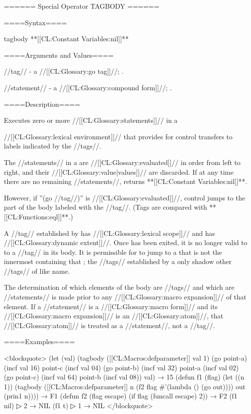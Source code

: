 ====== Special Operator TAGBODY ======

====Syntax====

\DefspecWithValues tagbody {} {**[[CL:Constant Variables:nil]]**}

====Arguments and Values====

//tag// - a //[[CL:Glossary:go tag]]//; \noeval.

//statement// - a //[[CL:Glossary:compound form]]//; \evalspecial.

====Description====

Executes zero or more //[[CL:Glossary:statements]]// in a

//[[CL:Glossary:lexical environment]]// that provides for control transfers to labels indicated by the //tags//.

The //statements// in a  are //[[CL:Glossary:evaluated]]// in order from left to right, and their //[[CL:Glossary:value|values]]// are discarded. If at any time there are no remaining //statements//,  returns **[[CL:Constant Variables:nil]]**.

However, if ''(go //tag//)'' is //[[CL:Glossary:evaluated]]//, control jumps to the part of the body labeled with the //tag//. (Tags are compared with **[[CL:Functions:eql]]**.)

A //tag// established by  has //[[CL:Glossary:lexical scope]]// and has //[[CL:Glossary:dynamic extent]]//. Once  has been exited, it is no longer valid to  to a //tag// in its body. It is permissible for  to jump to a  that is not the innermost  containing that ; the //tags// established by a  only shadow other //tags// of like name.

The determination of which elements of the body are //tags// and which are //statements// is made prior to any //[[CL:Glossary:macro expansion]]// of that element. If a //statement// is a //[[CL:Glossary:macro form]]// and its //[[CL:Glossary:macro expansion]]// is an //[[CL:Glossary:atom]]//, that //[[CL:Glossary:atom]]// is treated as a //statement//, not a //tag//.

====Examples====

<blockquote> (let (val) (tagbody ([[CL:Macros:defparameter]] val 1) (go point-a) (incf val 16) point-c (incf val 04) (go point-b) (incf val 32) point-a (incf val 02) (go point-c) (incf val 64) point-b (incf val 08)) val) → 15 (defun f1 (flag) (let ((n 1)) (tagbody ([[CL:Macros:defparameter]] n (f2 flag #'(lambda () (go out)))) out (prin1 n)))) → F1 (defun f2 (flag escape) (if flag (funcall escape) 2)) → F2 (f1 nil)
▷ 2 → NIL (f1 t)
▷ 1 → NIL </blockquote>

